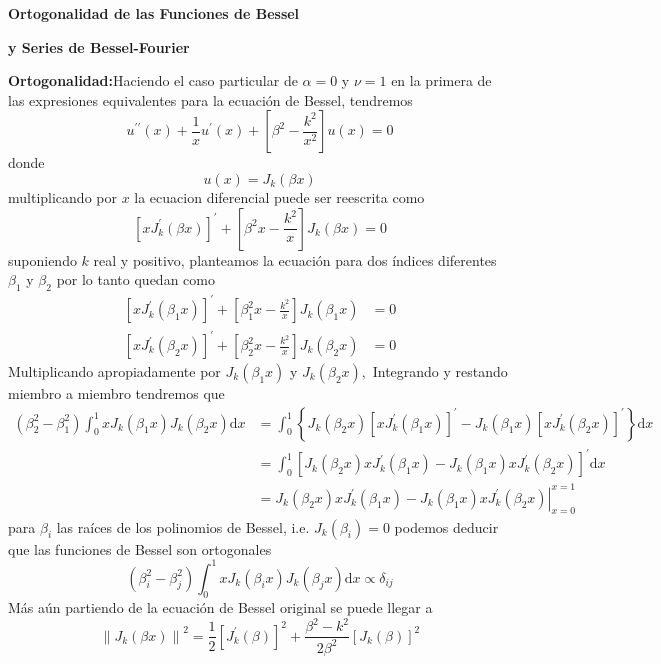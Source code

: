 \documentclass[spanish,notitlepage,letterpaper,12pt]{article}
\begin{document}
\begin{center}
\textbf{Ortogonalidad de las Funciones de Bessel}

\textbf{y Series de Bessel-Fourier}
\end{center}

\textbf{Ortogonalidad:}\newline Haciendo el caso particular de $\alpha=0$ y
$\nu=1$ en la primera de las expresiones equivalentes para la ecuaci\'{o}n de
Bessel, tendremos
\[
u^{\prime\prime}(x)+\frac{1}{x}u^{\prime}(x)+\left[  \beta^{2}-\frac{k^{2}%
}{x^{2}}\right]  u(x)=0
\]
donde
\[
u(x)=J_{k}(\beta x)
\]
multiplicando por $x$ la ecuacion diferencial puede ser reescrita como
\[
\left[  xJ_{k}^{\prime}(\beta x)\right]  ^{\prime}+\left[  \beta^{2}%
x-\frac{k^{2}}{x}\right]  J_{k}(\beta x)=0
\]
suponiendo $k$ real y positivo, planteamos la ecuaci\'{o}n para dos
\'{i}ndices diferentes $\beta_{1}$ y $\beta_{2}$ por lo tanto quedan como
\begin{align*}
\left[  xJ_{k}^{\prime}(\beta_{1}x)\right]  ^{\prime}+\left[  \beta_{1}%
^{2}x-\frac{k^{2}}{x}\right]  J_{k}(\beta_{1}x)  & =0\\
\left[  xJ_{k}^{\prime}(\beta_{2}x)\right]  ^{\prime}+\left[  \beta_{2}%
^{2}x-\frac{k^{2}}{x}\right]  J_{k}(\beta_{2}x)  & =0
\end{align*}
Multiplicando apropiadamente por $J_{k}(\beta_{1}x)$ y $J_{k}(\beta_{2}x),$
Integrando y restando miembro a miembro tendremos que
\begin{align*}
\left(  \beta_{2}^{2}-\beta_{1}^{2}\right)  \int_{0}^{1}xJ_{k}(\beta
_{1}x)J_{k}(\beta_{2}x)\mathrm{d}x  & =\int_{0}^{1}\left\{  J_{k}(\beta
_{2}x)\left[  xJ_{k}^{\prime}(\beta_{1}x)\right]  ^{\prime}-J_{k}(\beta
_{1}x)\left[  xJ_{k}^{\prime}(\beta_{2}x)\right]  ^{\prime}\right\}
\mathrm{d}x\\
& =\int_{0}^{1}\left[  J_{k}(\beta_{2}x)xJ_{k}^{\prime}(\beta_{1}%
x)-J_{k}(\beta_{1}x)xJ_{k}^{\prime}(\beta_{2}x)\right]  ^{\prime}%
\mathrm{d}x\\
& =\left.  J_{k}(\beta_{2}x)xJ_{k}^{\prime}(\beta_{1}x)-J_{k}(\beta
_{1}x)xJ_{k}^{\prime}(\beta_{2}x)\right|  _{x=0}^{x=1}%
\end{align*}
para $\beta_{i}$ las ra\'{i}ces de los polinomios de Bessel, i.e. $J_{k}%
(\beta_{i})=0$ podemos deducir que las funciones de Bessel son ortogonales
\[
\left(  \beta_{i}^{2}-\beta_{j}^{2}\right)  \int_{0}^{1}xJ_{k}(\beta
_{i}x)J_{k}(\beta_{j}x)\mathrm{d}x\propto\delta_{ij}%
\]
M\'{a}s a\'{u}n partiendo de la ecuaci\'{o}n de Bessel original se puede
llegar a
\[
\left\|  J_{k}(\beta x)\right\|  ^{2}=\frac{1}{2}\left[  J_{k}^{\prime}%
(\beta)\right]  ^{2}+\frac{\beta^{2}-k^{2}}{2\beta^{2}}\left[  J_{k}%
(\beta)\right]  ^{2}%
\]
\end{document}
